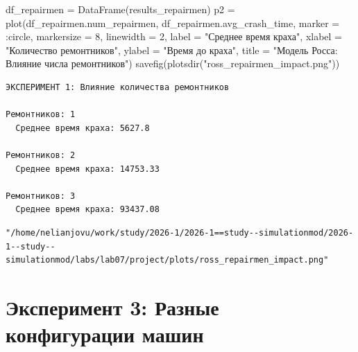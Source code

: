 \documentclass[
  12pt,
  a4paper,
  DIV=11,
  numbers=noendperiod]{scrreprt}
\newenvironment{Shaded}{\begin{snugshade}}{\end{snugshade}}
\newcommand{\FloatTok}[1]{\textcolor[rgb]{0.68,0.00,0.00}{#1}}
\newcommand{\FunctionTok}[1]{\textcolor[rgb]{0.28,0.35,0.67}{#1}}
\newcommand{\NormalTok}[1]{\textcolor[rgb]{0.00,0.23,0.31}{#1}}
\newcommand{\OperatorTok}[1]{\textcolor[rgb]{0.37,0.37,0.37}{#1}}
\newcommand{\StringTok}[1]{\textcolor[rgb]{0.13,0.47,0.30}{#1}}
\begin{document}
\begin{Shaded}
\begin{Highlighting}[]
\NormalTok{df\_repairmen }\OperatorTok{=} \FunctionTok{DataFrame}\NormalTok{(results\_repairmen)}
\NormalTok{p2 }\OperatorTok{=} \FunctionTok{plot}\NormalTok{(df\_repairmen.num\_repairmen, df\_repairmen.avg\_crash\_time,}
\NormalTok{    marker }\OperatorTok{=} \OperatorTok{:}\NormalTok{circle, markersize }\OperatorTok{=} \FloatTok{8}\NormalTok{, linewidth }\OperatorTok{=} \FloatTok{2}\NormalTok{,}
\NormalTok{    label }\OperatorTok{=} \StringTok{"Среднее время краха"}\NormalTok{,}
\NormalTok{    xlabel }\OperatorTok{=} \StringTok{"Количество ремонтников"}\NormalTok{,}
\NormalTok{    ylabel }\OperatorTok{=} \StringTok{"Время до краха"}\NormalTok{,}
\NormalTok{    title }\OperatorTok{=} \StringTok{"Модель Росса: Влияние числа ремонтников"}\NormalTok{)}
\FunctionTok{savefig}\NormalTok{(}\FunctionTok{plotsdir}\NormalTok{(}\StringTok{"ross\_repairmen\_impact.png"}\NormalTok{))}
\end{Highlighting}
\end{Shaded}

\begin{verbatim}
ЭКСПЕРИМЕНТ 1: Влияние количества ремонтников

Ремонтников: 1
  Среднее время краха: 5627.8

Ремонтников: 2
  Среднее время краха: 14753.33

Ремонтников: 3
  Среднее время краха: 93437.08
\end{verbatim}

\begin{verbatim}
"/home/nelianjovu/work/study/2026-1/2026-1==study--simulationmod/2026-1--study--simulationmod/labs/lab07/project/plots/ross_repairmen_impact.png"
\end{verbatim}

\section{Эксперимент 3: Разные конфигурации
машин}\label{ux44dux43aux441ux43fux435ux440ux438ux43cux435ux43dux442-3-ux440ux430ux437ux43dux44bux435-ux43aux43eux43dux444ux438ux433ux443ux440ux430ux446ux438ux438-ux43cux430ux448ux438ux43d}
\end{document}

